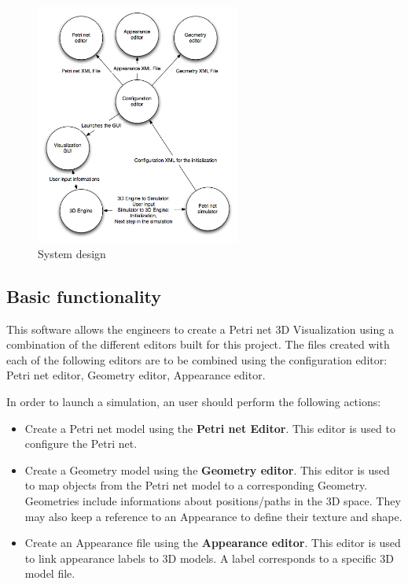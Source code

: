 \begin{figure}[htp]
\begin{center}
  \includegraphics[width=0.6\textwidth]{image/system_design.png}
  \caption{System design}
  \label{fig:system_diagram}
\end{center}
\end{figure}

\subsection{Basic functionality}


This software allows the engineers to create a Petri net 3D Visualization using a combination of the different editors built for this project.
The files created with each of the following editors are to be combined using the configuration editor: \newline
Petri net editor, Geometry editor, Appearance editor. 

In order to launch a simulation, an user should perform the following actions:

\begin{itemize}
  \item Create a Petri net model using the \textbf{Petri net Editor}. This editor is used to configure the Petri net.
  \item Create a Geometry model using the \textbf{Geometry editor}. This editor is used to map objects from the Petri net model to a corresponding Geometry. Geometries include informations about positions/paths in the 3D space. They may also keep a reference to an Appearance to define their texture and shape.
  \item Create an Appearance file using the \textbf{Appearance editor}. This editor is used to link appearance labels to 3D models. A label corresponds to a specific 3D model file. 
\end{itemize}

